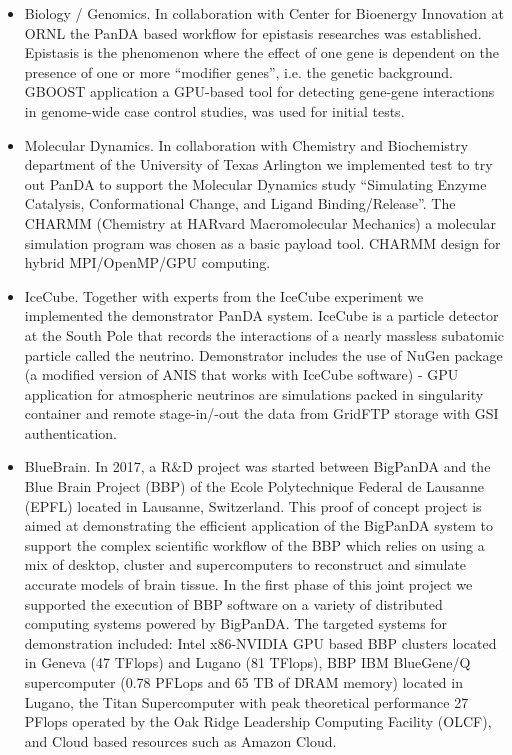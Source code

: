 \begin{itemize}
    \item Biology / Genomics. 
In collaboration with Center for Bioenergy Innovation at ORNL the PanDA based
workflow for epistasis researches was established. Epistasis is the phenomenon
where the effect of one gene is dependent on the presence of one or more
``modifier genes'', i.e. the genetic background. GBOOST application \cite{GBOOST} a
GPU-based tool for detecting gene-gene interactions in genome-wide case control
studies, was used for initial tests.

    \item Molecular Dynamics.
In collaboration with Chemistry and Biochemistry department of the University
of Texas Arlington we implemented test to try out PanDA to support the
Molecular Dynamics study ``Simulating Enzyme Catalysis, Conformational Change,
and Ligand Binding/Release''. The CHARMM (Chemistry at HARvard Macromolecular
Mechanics) \cite{Brooks2009CHARMM} a molecular simulation program was chosen as a basic
payload tool. CHARMM design for hybrid MPI/OpenMP/GPU computing.

    \item IceCube. 
Together with  experts from the IceCube experiment we implemented the
demonstrator PanDA system. IceCube \cite{Halzen:2010yj} is a particle detector at the
South Pole that records the interactions of a nearly massless subatomic
particle called the neutrino. Demonstrator includes the use of NuGen package (a
modified version of ANIS \cite{Gazizov:2004va} that works with IceCube software) - GPU
application for atmospheric neutrinos are simulations packed in singularity
container and remote stage-in/-out the data from GridFTP \cite{Allcock:2005:GSG:1105760.1105819} storage with
GSI authentication. 

    \item BlueBrain.
In 2017, a R\&D project was started between BigPanDA and the Blue Brain Project
(BBP) \cite{Markram} of the Ecole Polytechnique Federal de Lausanne (EPFL) located in
Lausanne, Switzerland. This proof of concept project is aimed at demonstrating
the efficient application of the BigPanDA system to support the complex
scientific workflow of the BBP which relies on using a mix of desktop, cluster
and supercomputers to reconstruct and simulate accurate models of brain tissue.
In the first phase of this joint project we supported the execution of BBP
software on a variety of distributed computing systems powered by BigPanDA. The
targeted systems for demonstration included: Intel x86-NVIDIA GPU based BBP
clusters located in Geneva (47 TFlops) and Lugano (81 TFlops), BBP IBM
BlueGene/Q supercomputer \cite{citeulike:472727} (0.78 PFLops and 65 TB of DRAM memory)
located in Lugano, the Titan Supercomputer with peak theoretical performance 27
PFlops operated by the Oak Ridge Leadership Computing Facility (OLCF), and
Cloud based resources such as Amazon Cloud.


\end{itemize}
